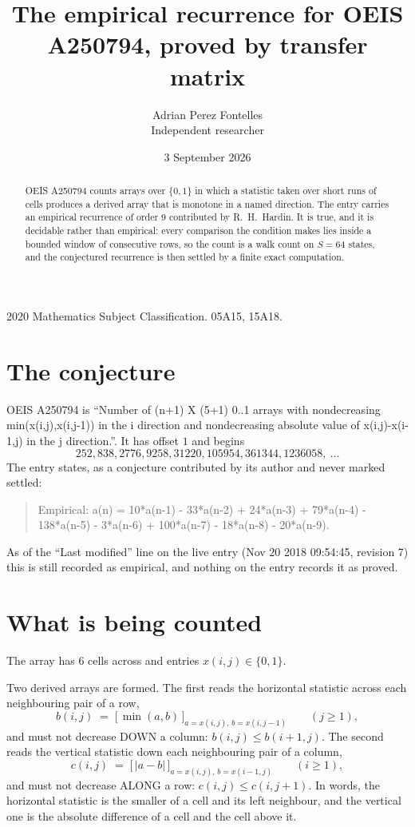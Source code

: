 \documentclass[11pt,a4paper]{article}
\title{The empirical recurrence for OEIS A250794, proved by transfer matrix}
\author{Adrian Perez Fontelles\\ \small Independent researcher}
\date{3 September 2026}
\theoremstyle{plain}
\theoremstyle{definition}
\begin{document}
\maketitle

\begin{abstract}
OEIS A250794 counts arrays over $\{0,1\}$ in which a statistic taken over short runs
of cells produces a derived array that is monotone in a named direction. The entry carries an
empirical recurrence of order $9$ contributed by R.~H.~Hardin. It is true, and it is
decidable rather than empirical: every comparison the condition makes lies inside a bounded
window of consecutive rows, so the count is a walk count on $S=64$ states, and the
conjectured recurrence is then settled by a finite exact computation.
\end{abstract}

\noindent\small 2020 Mathematics Subject Classification. 05A15, 15A18.\normalsize

\section{The conjecture}

OEIS A250794 is ``Number of (n+1) X (5+1) 0..1 arrays with nondecreasing min(x(i,j),x(i,j-1)) in the i direction and nondecreasing absolute value of x(i,j)-x(i-1,j) in the j direction.''. It has offset $1$ and begins
\[
252, 838, 2776, 9258, 31220, 105954, 361344, 1236058,\ \dots
\]
The entry states, as a conjecture contributed by its author and never marked settled:
\begin{quote}
Empirical: a(n) = 10*a(n-1) - 33*a(n-2) + 24*a(n-3) + 79*a(n-4) - 138*a(n-5) - 3*a(n-6) + 100*a(n-7) - 18*a(n-8) - 20*a(n-9).
\end{quote}
As of the ``Last modified'' line on the live entry (Nov 20 2018 09:54:45, revision 7) this is still
recorded as empirical, and nothing on the entry records it as proved.

\section{What is being counted}

The array has $6$ cells across and entries $x(i,j)\in\{0,1\}$.

Two derived arrays are formed. The first reads the horizontal statistic across each
neighbouring pair of a row,
\[
b(i,j)\;=\;\bigl[\,\min(a,b)\,\bigr]_{a=x(i,j),\,b=x(i,j-1)}\qquad (j\ge1),
\]
and must not decrease DOWN a column: $b(i,j)\le b(i{+}1,j)$. The second reads the vertical
statistic down each neighbouring pair of a column,
\[
c(i,j)\;=\;\bigl[\,\lvert a-b\rvert\,\bigr]_{a=x(i,j),\,b=x(i{-}1,j)}\qquad (i\ge1),
\]
and must not decrease ALONG a row: $c(i,j)\le c(i,j{+}1)$. In words, the horizontal statistic
is the smaller of a cell and its left neighbour, and the vertical one is
the absolute difference of a cell and the cell above it.
\end{document}
